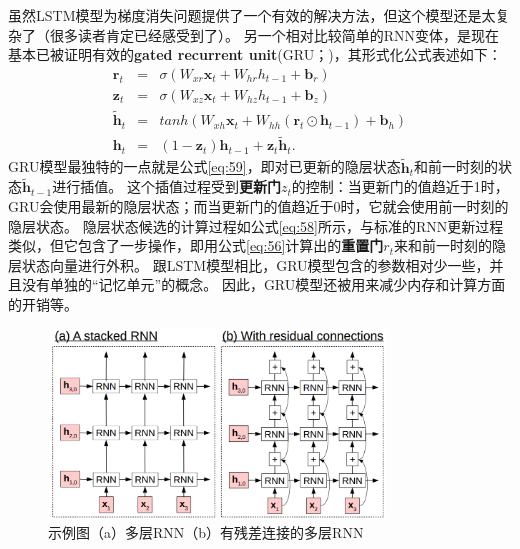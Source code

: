\documentclass[10pt,a4paper]{ctexart}
\begin{document}
虽然LSTM模型为梯度消失问题提供了一个有效的解决方法，但这个模型还是太复杂了（很多读者肯定已经感受到了）。
另一个相对比较简单的RNN变体，是现在基本已被证明有效的\textbf{gated recurrent unit}(GRU；\cite{chung2014empirical})，其形式化公式表述如下：
\begin{eqnarray}
 \textbf{r}_t & = & \sigma (W_{xr}\textbf{x}_t + W_{hr}h_{t-1} + \textbf{b}_r) \label{eq:56}\\
 \textbf{z}_t & = & \sigma (W_{xz}\textbf{x}_t + W_{hz}h_{t-1} + \textbf{b}_z) \label{eq:57}\\
 \tilde{\textbf{h}}_t & = & tanh(W_{xh}\textbf{x}_t + W_{hh}(\textbf{r}_t \odot \textbf{h}_{t-1}) + \textbf{b}_h) \label{eq:58}\\
 \textbf{h}_t & = & (1 - \textbf{z}_t)\textbf{h}_{t-1} + \textbf{z}_t \tilde{\textbf{h}}_t. \label{eq:59}
\end{eqnarray}
GRU模型最独特的一点就是公式\ref{eq:59}，即对已更新的隐层状态$\tilde{\textbf{h}}_t$和前一时刻的状态$\tilde{\textbf{h}}_{t-1}$进行插值。
这个插值过程受到\textbf{更新门$z_t$}的控制：当更新门的值趋近于1时，GRU会使用最新的隐层状态；而当更新门的值趋近于0时，它就会使用前一时刻的隐层状态。
隐层状态候选的计算过程如公式\ref{eq:58}所示，与标准的RNN更新过程类似，但它包含了一步操作，即用公式\ref{eq:56}计算出的\textbf{重置门$r_t$}来和前一时刻的隐层状态向量进行外积。
跟LSTM模型相比，GRU模型包含的参数相对少一些，并且没有单独的“记忆单元”的概念。
因此，GRU模型还被用来减少内存和计算方面的开销等。

\begin{figure}[H]
\centering
\includegraphics[width=0.8\textwidth]{fig18.png}
\caption{示例图（a）多层RNN（b）有残差连接的多层RNN}
\label{fig:18}
\end{figure}
\end{document}
